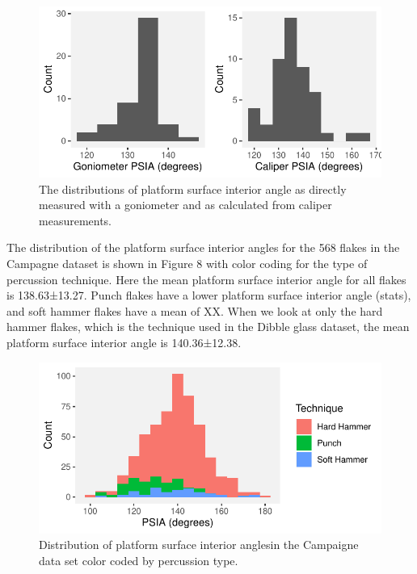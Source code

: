 \documentclass[10pt,letterpaper]{article}
\begin{document}
\begin{figure}
\centering
\includegraphics{PSIA_Manuscript_files/figure-latex/fig7_remeasure_distributions-1.pdf}
\caption{The distributions of platform surface interior angle as
directly measured with a goniometer and as calculated from caliper
measurements.}
\end{figure}

The distribution of the platform surface interior angles for the 568
flakes in the Campagne dataset is shown in Figure 8 with color coding
for the type of percussion technique. Here the mean platform surface
interior angle for all flakes is 138.63±13.27. Punch flakes have a lower
platform surface interior angle (stats), and soft hammer flakes have a
mean of XX. When we look at only the hard hammer flakes, which is the
technique used in the Dibble glass dataset, the mean platform surface
interior angle is 140.36±12.38.

\begin{figure}
\centering
\includegraphics{PSIA_Manuscript_files/figure-latex/fig8-camp_angles-1.pdf}
\caption{Distribution of platform surface interior anglesin the
Campaigne data set color coded by percussion type.}
\end{figure}
\end{document}
